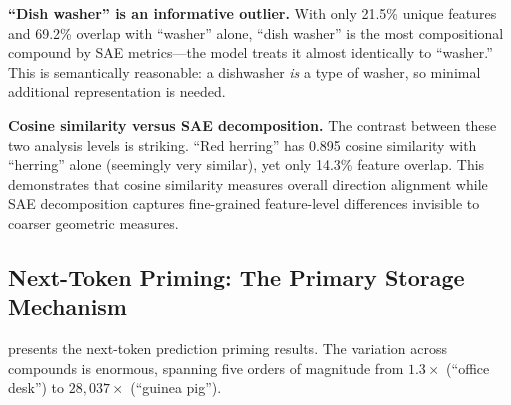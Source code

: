 {\bf ``Dish washer'' is an informative outlier.}
With only 21.5\% unique features and 69.2\% overlap with ``washer'' alone, ``dish washer'' is the most compositional compound by SAE metrics---the model treats it almost identically to ``washer.''
This is semantically reasonable: a dishwasher \emph{is} a type of washer, so minimal additional representation is needed.

{\bf Cosine similarity versus SAE decomposition.}
The contrast between these two analysis levels is striking.
``Red herring'' has 0.895 cosine similarity with ``herring'' alone (seemingly very similar), yet only 14.3\% feature overlap.
This demonstrates that cosine similarity measures overall direction alignment while SAE decomposition captures fine-grained feature-level differences invisible to coarser geometric measures.

\subsection{Next-Token Priming: The Primary Storage Mechanism}
\label{sec:results_exp3}

 presents the next-token prediction priming results.
The variation across compounds is enormous, spanning five orders of magnitude from $1.3\times$ (``office desk'') to $28{,}037\times$ (``guinea pig'').

